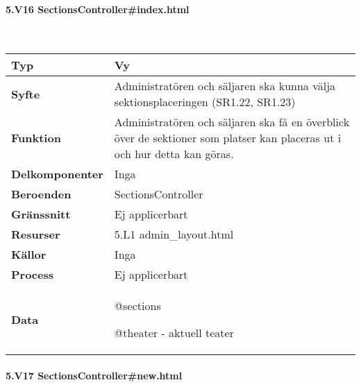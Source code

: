 \documentclass[a4paper, twoside, 11pt, titlepage]{article}
\begin{document}
			\clearpage %
			\paragraph{5.V16 SectionsController\#index.html}\

			\begin {table} [ht] \begin{tabular} {  p{3.5cm} p{11.6cm} }
				\hline
				{\sffamily\textbf{Typ}} & {Vy} \\
				\hline
				{\sffamily\textbf{Syfte}} & {Administratören och säljaren ska kunna välja sektionsplaceringen (SR1.22, SR1.23)} \\
				\hline
				{\sffamily\textbf{Funktion}} & {Administratören och säljaren ska få en överblick över de sektioner som platser kan placeras ut i och hur detta kan göras.} \\
				\hline
				{\sffamily\textbf{Delkomponenter}} & {Inga} \\
				\hline
				{\sffamily\textbf{Beroenden}} & {SectionsController} \\
				\hline
				{\sffamily\textbf{Gränssnitt}} & {Ej applicerbart} \\
				\hline
				{\sffamily\textbf{Resurser}} & {5.L1 admin\_layout.html} \\
				\hline
				{\sffamily\textbf{Källor}} & {Inga} \\
				\hline
				{\sffamily\textbf{Process}} & {Ej applicerbart} \\
				\hline
				{\sffamily\textbf{Data}} & {@sections

@theater - aktuell teater} \\
				\hline
			\end{tabular} \end{table} \FloatBarrier


			\paragraph{5.V17 SectionsController\#new.html}\
\end{document}
